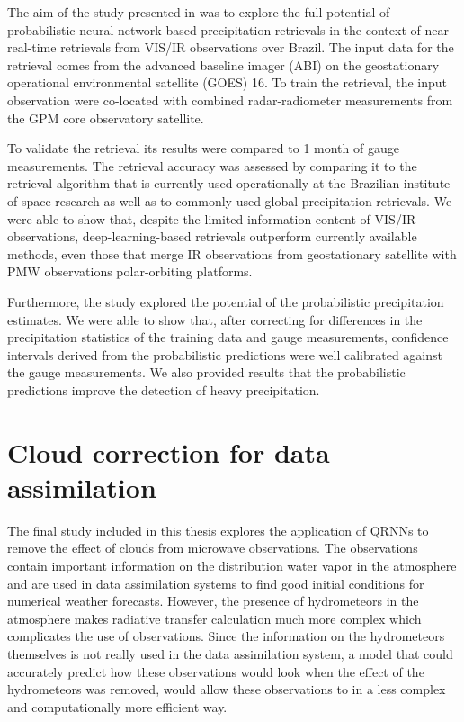 The aim of the study presented in \citet{pfreundschuh22b} was to explore the
full potential of probabilistic neural-network based precipitation retrievals in
the context of near real-time retrievals from VIS/IR observations over Brazil.
The input data for the retrieval comes from the advanced baseline imager (ABI)
on the geostationary operational environmental satellite (GOES) 16. To train the
retrieval, the input observation were co-located with combined radar-radiometer
measurements from the GPM core observatory satellite.

To validate the retrieval its results were compared to 1 month of gauge
measurements. The retrieval accuracy was assessed by comparing it to the
retrieval algorithm that is currently used operationally at the Brazilian
institute of space research as well as to commonly used global precipitation
retrievals. We were able to show that, despite the limited information content
of VIS/IR observations, deep-learning-based retrievals outperform currently
available methods, even those that merge IR observations from geostationary
satellite with PMW observations polar-orbiting platforms.

Furthermore, the study explored the potential of the probabilistic precipitation
estimates. We were able to show that, after correcting for differences in the
precipitation statistics of the training data and gauge measurements, confidence
intervals derived from the probabilistic predictions were well calibrated
against the gauge measurements. We also provided results that the probabilistic
predictions improve the detection of heavy precipitation.


\section{Cloud correction for data assimilation}

The final study included in this thesis explores the application of QRNNs to
remove the effect of clouds from microwave observations. The observations
contain important information on the distribution water vapor in the atmosphere
and are used in data assimilation systems to find good initial conditions for
numerical weather forecasts. However, the presence of hydrometeors in the
atmosphere makes radiative transfer calculation much more complex which
complicates the use of observations. Since the information on the hydrometeors
themselves is not really used in the data assimilation system, a model that
could accurately predict how these observations would look when the effect of
the hydrometeors was removed, would allow these observations to in a less
complex and computationally more efficient way.

